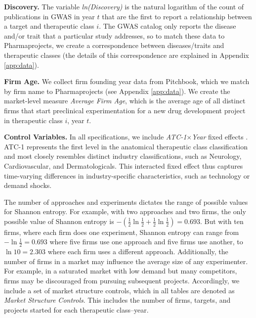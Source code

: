 \noindent \textbf{Discovery.} The variable \emph{ln(Discovery)} is the natural logarithm of the count of publications in GWAS in year $t$ that are the first to report a relationship between a target and therapeutic class $i$. The GWAS catalog only reports the disease and/or trait that a particular study addresses, so to match these data to Pharmaprojects, we create a correspondence between diseases/traits and therapeutic classes (the details of this correspondence are explained in Appendix \ref{app:data}).


\noindent \textbf{Firm Age.} We collect firm founding year data from Pitchbook, which we match by firm name to Pharmaprojects (see Appendix \ref{app:data}). We create the market-level measure \emph{Average Firm Age}, which is the average age of all distinct firms that start preclinical experimentation for a new drug development project in therapeutic class $i$, year $t$.

\noindent \textbf{Control Variables.} In all specifications, we include \emph{ATC-1$\times$Year} fixed effects \citep{branstetter2022generic}. ATC-1 represents the first level in the anatomical therapeutic class classification and most closely resembles distinct industry classifications, such as Neurology, Cardiovascular, and Dermatologicals. This interacted fixed effect thus captures time-varying differences in industry-specific characteristics, such as technology or demand shocks.

The number of approaches and experiments dictates the range of possible values for Shannon entropy. For example, with two approaches and two firms, the only possible value of Shannon entropy is $-(\frac{1}{2}\ln\frac{1}{2} + \frac{1}{2}\ln\frac{1}{2})=0.693$. But with ten firms, where each firm does one experiment, Shannon entropy can range from $-\ln\frac{1}{2}=0.693$ where five firms use one approach and five firms use another, to $\ln10=2.303$ where each firm uses a different approach. Additionally, the number of firms in a market may influence the average size of any experimenter. For example, in a saturated market with low demand but many competitors, firms may be discouraged from pursuing subsequent projects. Accordingly, we include a set of market structure controls, which in all tables are denoted as \emph{Market Structure Controls}. This includes the number of firms, targets, and projects started for each therapeutic class--year.



